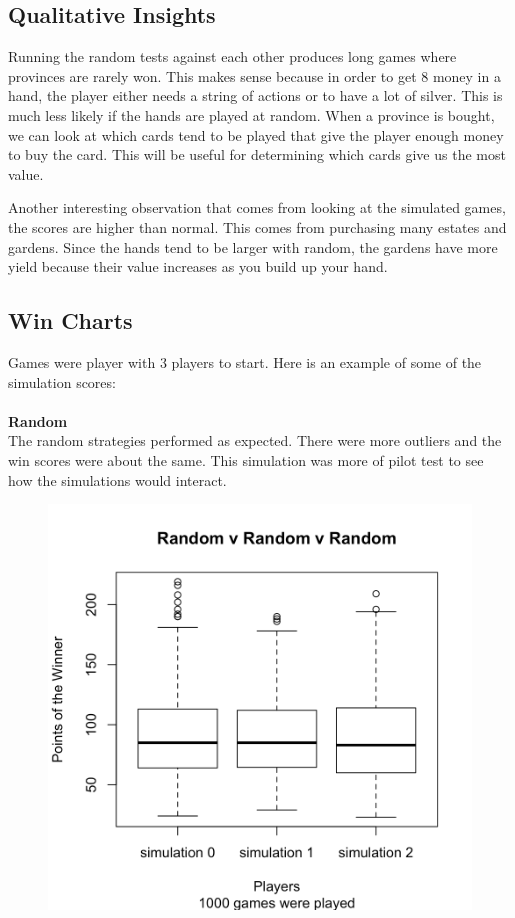 \documentclass[11pt, oneside]{article}   	%
\begin{document}
\subsection{Qualitative Insights}

Running the random tests against each other produces long games where provinces are rarely won. This makes sense because in order to get 8 money in a hand, the player either needs a string of actions or to have a lot of silver. This is much less likely if the hands are played at random. When a province is bought, we can look at which cards tend to be played that give the player enough money to buy the card. This will be useful for determining which cards give us the most value. 

Another interesting observation that comes from looking at the simulated games, the scores are higher than normal. This comes from purchasing many estates and gardens. Since the hands tend to be larger with random, the gardens have more yield because their value increases as you build up your hand.

\subsection{Win Charts}

Games were player with 3 players to start. Here is an example of some of the simulation scores: 
\\
\\
\textbf{Random} 
\\

The random strategies performed as expected. There were more outliers and the win scores were about the same. This simulation was more of pilot test to see how the simulations would interact. 

\begin{figure}[H]
\includegraphics[width=.75\textwidth]{random_random_random}
\centering
\end{figure}
\end{document}
